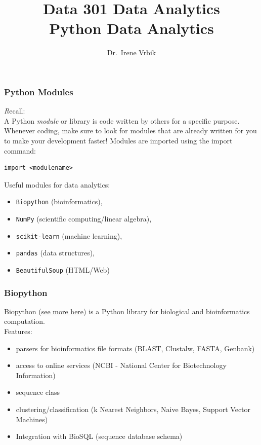 \documentclass[xcolor=svgnames]{beamer}
\title
  [Data 301 Data Analytics]
  {Data 301 Data Analytics\\
Python Data Analytics}
\author
  [Dr.\ Irene Vrbik]
  {Dr.\ Irene Vrbik}
\date
  {}
\institute
  {University of British Columbia Okanagan \newline irene.vrbik@ubc.ca}
\newcommand{\nl}{\\[1em]}
\newcommand{\ft}[1]{\frametitle{#1}}
\begin{document}
\maketitle





\begin{frame}[fragile]\ft{Python Modules}
{\textit Recall:}\\
A Python \emph{module} or library is code written by others for a specific purpose.  Whenever coding, make sure to look for modules that are already written for you to make your development faster!
Modules are imported using the import command:

\begin{Verbatim}[xleftmargin=.5in] 
import <modulename>
\end{Verbatim}

Useful modules for data analytics:
\begin{itemize}
\item {\tt Biopython} (bioinformatics), 
\item {\tt NumPy} (scientific computing/linear algebra), 
\item {\tt scikit-learn} (machine learning), 
\item {\tt pandas} (data structures), 
\item {\tt BeautifulSoup} (HTML/Web)
\end{itemize}
\end{frame}


\begin{frame}
[fragile]\ft{Biopython}
Biopython (\href{http://biopython.org}{see more here}) is a Python library for biological and bioinformatics computation.\nl

Features:
\begin{itemize}
\item parsers for bioinformatics file formats (BLAST, Clustalw, FASTA, Genbank)
\item access to online services (NCBI - National Center for Biotechnology Information)
\item sequence class
\item clustering/classification (k Nearest Neighbors, Naive Bayes, Support Vector Machines)
\item Integration with BioSQL (sequence database schema)
\end{itemize}
\end{frame}
\end{document}
